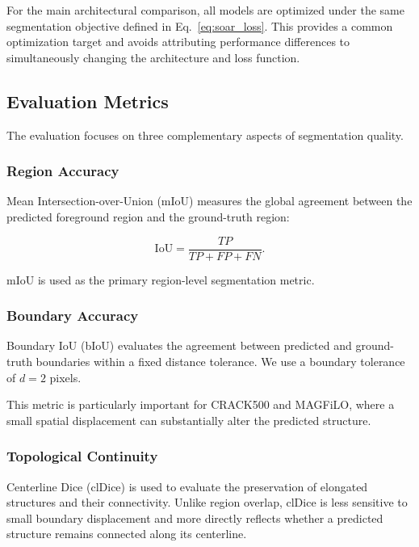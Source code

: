 \documentclass[11pt,a4paper]{article}
\begin{document}
For the main architectural comparison, all models are optimized under the 
same segmentation objective defined in Eq.~\eqref{eq:soar_loss}. This 
provides a common optimization target and avoids attributing performance 
differences to simultaneously changing the architecture and loss function.


\subsection{Evaluation Metrics}

The evaluation focuses on three complementary aspects of segmentation 
quality.

\subsubsection{Region Accuracy}

Mean Intersection-over-Union (mIoU) measures the global agreement between 
the predicted foreground region and the ground-truth region:

\begin{equation}
\mathrm{IoU}
=
\frac{TP}{TP+FP+FN}.
\end{equation}

mIoU is used as the primary region-level segmentation metric.

\subsubsection{Boundary Accuracy}

Boundary IoU (bIoU) evaluates the agreement between predicted and ground-truth 
boundaries within a fixed distance tolerance. We use a boundary tolerance 
of $d=2$ pixels.

This metric is particularly important for CRACK500 and MAGFiLO, where a 
small spatial displacement can substantially alter the predicted structure.

\subsubsection{Topological Continuity}

Centerline Dice (clDice) is used to evaluate the preservation of elongated 
structures and their connectivity. Unlike region overlap, clDice is less 
sensitive to small boundary displacement and more directly reflects whether 
a predicted structure remains connected along its centerline.
\end{document}
